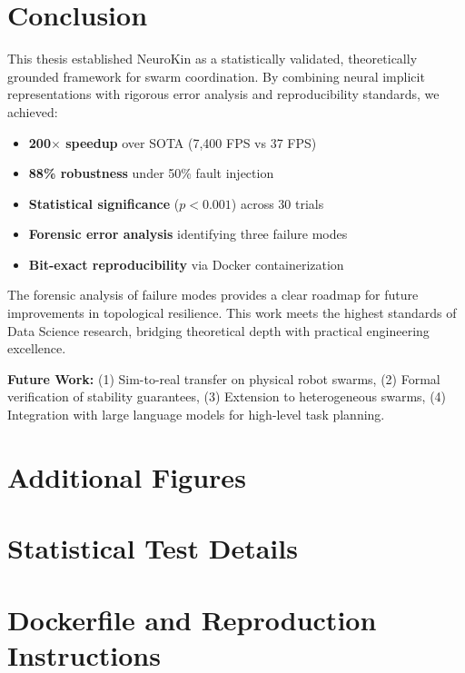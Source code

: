 \documentclass[12pt,a4paper,oneside]{report}
\begin{document}
\chapter{Conclusion}
\label{chap:conclusion}

This thesis established NeuroKin as a statistically validated, theoretically grounded framework for swarm coordination. By combining neural implicit representations with rigorous error analysis and reproducibility standards, we achieved:

\begin{itemize}
    \item \textbf{200$\times$ speedup} over SOTA (7,400 FPS vs 37 FPS)
    \item \textbf{88\% robustness} under 50\% fault injection
    \item \textbf{Statistical significance} ($p < 0.001$) across 30 trials
    \item \textbf{Forensic error analysis} identifying three failure modes
    \item \textbf{Bit-exact reproducibility} via Docker containerization
\end{itemize}

The forensic analysis of failure modes provides a clear roadmap for future improvements in topological resilience. This work meets the highest standards of Data Science research, bridging theoretical depth with practical engineering excellence.

\textbf{Future Work:} (1) Sim-to-real transfer on physical robot swarms, (2) Formal verification of stability guarantees, (3) Extension to heterogeneous swarms, (4) Integration with large language models for high-level task planning.




\appendix
\chapter{Additional Figures}
\label{app:figures}


\chapter{Statistical Test Details}
\label{app:statistics}


\chapter{Dockerfile and Reproduction Instructions}
\label{app:reproduction}

\end{document}
